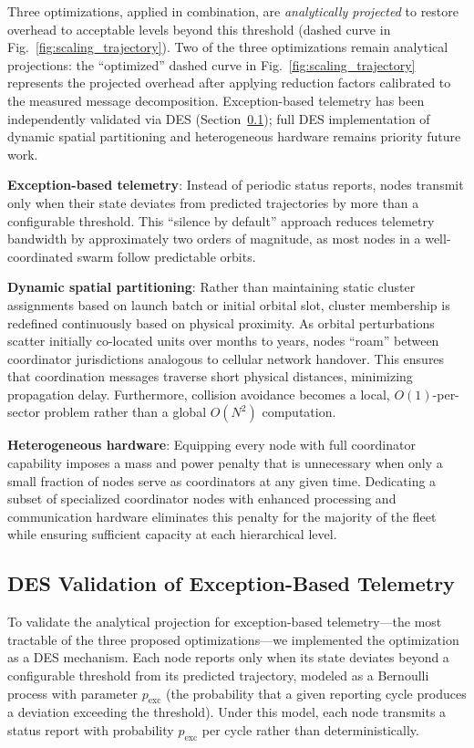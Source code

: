 \documentclass[journal]{IEEEtran}
\begin{document}
Three optimizations, applied in combination, are \emph{analytically projected} to restore overhead to acceptable levels beyond this threshold (dashed curve in Fig.~\ref{fig:scaling_trajectory}). Two of the three optimizations remain analytical projections: the ``optimized'' dashed curve in Fig.~\ref{fig:scaling_trajectory} represents the projected overhead after applying reduction factors calibrated to the measured message decomposition. Exception-based telemetry has been independently validated via DES (Section~\ref{sec:exception_telemetry}); full DES implementation of dynamic spatial partitioning and heterogeneous hardware remains priority future work.

\textbf{Exception-based telemetry}: Instead of periodic status reports, nodes transmit only when their state deviates from predicted trajectories by more than a configurable threshold. This ``silence by default'' approach reduces telemetry bandwidth by approximately two orders of magnitude, as most nodes in a well-coordinated swarm follow predictable orbits.

\textbf{Dynamic spatial partitioning}: Rather than maintaining static cluster assignments based on launch batch or initial orbital slot, cluster membership is redefined continuously based on physical proximity. As orbital perturbations scatter initially co-located units over months to years, nodes ``roam'' between coordinator jurisdictions analogous to cellular network handover. This ensures that coordination messages traverse short physical distances, minimizing propagation delay. Furthermore, collision avoidance becomes a local, $O(1)$-per-sector problem rather than a global $O(N^2)$ computation.

\textbf{Heterogeneous hardware}: Equipping every node with full coordinator capability imposes a mass and power penalty that is unnecessary when only a small fraction of nodes serve as coordinators at any given time. Dedicating a subset of specialized coordinator nodes with enhanced processing and communication hardware eliminates this penalty for the majority of the fleet while ensuring sufficient capacity at each hierarchical level.

\subsection{DES Validation of Exception-Based Telemetry}
\label{sec:exception_telemetry}

To validate the analytical projection for exception-based telemetry---the most tractable of the three proposed optimizations---we implemented the optimization as a DES mechanism. Each node reports only when its state deviates beyond a configurable threshold from its predicted trajectory, modeled as a Bernoulli process with parameter $p_{\text{exc}}$ (the probability that a given reporting cycle produces a deviation exceeding the threshold). Under this model, each node transmits a status report with probability $p_{\text{exc}}$ per cycle rather than deterministically.
\end{document}
